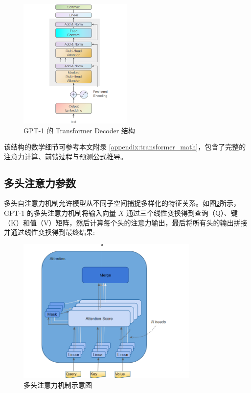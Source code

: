 \documentclass[a4paper,12pt]{article}
\begin{document}
\begin{figure}[H]
    \centering
    \includegraphics[width=0.5\textwidth]{image/image1.png}
    \caption{GPT-1 的 Transformer Decoder 结构}
    \label{fig:transformer_decoder_structure}
\end{figure}

该结构的数学细节可参考本文附录 \ref{appendix:transformer_math}，包含了完整的注意力计算、前馈过程与预测公式推导。


\subsection{多头注意力参数}

多头自注意力机制允许模型从不同子空间捕捉多样化的特征关系。如图\ref{fig:multihead_attention}所示，GPT-1 的多头注意力机制将输入向量 $X$ 通过三个线性变换得到查询（Q）、键（K）和值（V）矩阵，然后计算每个头的注意力输出，最后将所有头的输出拼接并通过线性变换得到最终结果:

\begin{figure}[H]
    \centering
    \includegraphics[width=0.8\textwidth]{image/多头注意力.png}
    \caption{多头注意力机制示意图}
    \label{fig:multihead_attention}
\end{figure}
\end{document}
